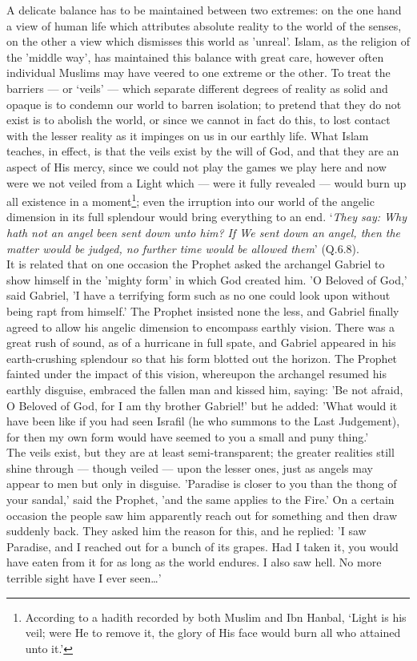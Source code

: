 \documentclass[10pt, twoside,openright]{book}
\begin{document}
A delicate balance has to be maintained between two extremes: on the one hand a view of human life 
which attributes absolute reality to the world of the senses, on the other a view which dismisses 
this world as 'unreal'. Islam, as the religion of the 'middle way', has maintained this balance with 
great care, however often individual Muslims may have veered to one extreme or the other. To treat 
the barriers --- or `veils' --- which separate different degrees of reality as solid and opaque is to 
condemn our world to barren isolation; to pretend that they do not exist is to abolish the world, or 
since we cannot in fact do this, to lost contact with the lesser reality as it impinges on us in our 
earthly life. What Islam teaches, in effect, is that the veils exist by the will of God, and that 
they are an aspect of His mercy, since we could not play the games we play here and now were we not 
veiled from a Light which --- were it fully revealed --- would burn up all existence in a moment\footnote{According to a hadith recorded by both Muslim and Ibn Hanbal, `Light is his veil; were He to remove 
it, the glory of His face would burn all who attained unto it.'}; even 
the irruption into our world of the angelic dimension in its full splendour would bring everything to 
an end. `\emph{They say: Why hath not an angel been sent down unto him? If We sent down an angel, then the 
matter would be judged, no further time would be allowed them}' (Q.6.8). \\

It is related that on one occasion the Prophet asked the archangel Gabriel to show himself in the 
'mighty form' in which God created him. 'O Beloved of God,' said Gabriel, 'I have a terrifying form 
such as no one could look upon without being rapt from himself.' The Prophet insisted none the less, 
and Gabriel finally agreed to allow his angelic dimension to encompass earthly vision. There was a 
great rush of sound, as of a hurricane in full spate, and Gabriel appeared in his earth\hyp{}crushing 
splendour so that his form blotted out the horizon. The Prophet fainted under the impact of this 
vision, whereupon the archangel resumed his earthly disguise, embraced the fallen man and kissed him, 
saying: 'Be not afraid, O Beloved of God, for I am thy brother Gabriel!' but he added: 'What would it 
have been like if you had seen Israfil (he who summons to the Last Judgement), for then my own form 
would have seemed to you a small and puny thing.' \\

The veils exist, but they are at least semi-transparent; the greater realities still shine through --- 
though veiled --- upon the lesser ones, just as angels may appear to men but only in disguise. 
'Paradise is closer to you than the thong of your sandal,' said the Prophet, 'and the same applies to 
the Fire.' On a certain occasion the people saw him apparently reach out for something and then draw 
suddenly back. They asked him the reason for this, and he replied: 'I saw Paradise, and I reached out 
for a bunch of its grapes. Had I taken it, you would have eaten from it for as long as the world 
endures. I also saw hell. No more terrible sight have I ever seen\ldots{}' \\
\end{document}
